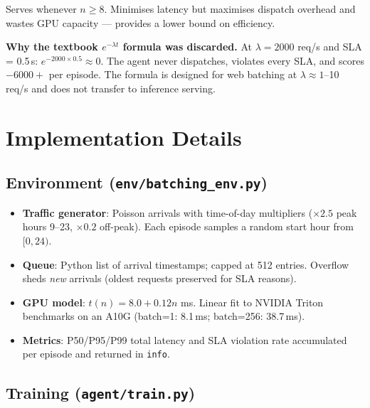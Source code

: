 \documentclass[11pt,a4paper]{article}
\begin{document}
Serves whenever $n \geq 8$. Minimises latency but maximises dispatch overhead
and wastes GPU capacity — provides a lower bound on efficiency.

\begin{warnbox}
\textbf{Why the textbook $e^{-\lambda t}$ formula was discarded.}
At $\lambda=2000$ req/s and SLA = 0.5\,s: $e^{-2000 \times 0.5} \approx 0$.
The agent never dispatches, violates every SLA, and scores $-6000+$ per episode.
The formula is designed for web batching at $\lambda \approx 1$--10 req/s and
does not transfer to inference serving.
\end{warnbox}

\section{Implementation Details}

\subsection{Environment (\texttt{env/batching\_env.py})}

\begin{itemize}[noitemsep]
  \item \textbf{Traffic generator}: Poisson arrivals with time-of-day multipliers
        ($\times2.5$ peak hours 9--23, $\times0.2$ off-peak). Each episode
        samples a random start hour from $[0,24)$.
  \item \textbf{Queue}: Python list of arrival timestamps; capped at 512 entries.
        Overflow sheds \emph{new} arrivals (oldest requests preserved for SLA reasons).
  \item \textbf{GPU model}: $t(n) = 8.0 + 0.12n$ ms. Linear fit to NVIDIA Triton
        benchmarks on an A10G (batch=1: 8.1\,ms; batch=256: 38.7\,ms).
  \item \textbf{Metrics}: P50/P95/P99 total latency and SLA violation rate
        accumulated per episode and returned in \texttt{info}.
\end{itemize}

\subsection{Training (\texttt{agent/train.py})}
\end{document}
